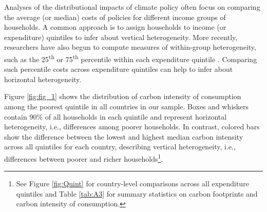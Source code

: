 \documentclass[12pt, a4paper]{article}
\begin{document}
Analyses of the distributional impacts of climate policy often focus on comparing the average (or median) costs of policies for different income groups of households. A common approach is to assign households to income (or expenditure) quintiles to infer about vertical heterogeneity. More recently, researchers have also begun to compute measures of within-group heterogeneity, such as the 25\textsuperscript{th} or 75\textsuperscript{th} percentile within each expenditure quintile \autocite{Cronin.2019, Missbach.2024}. Comparing such percentile costs across expenditure quintiles can help to infer about horizontal heterogeneity.

Figure \ref{fig:fig_1} shows the distribution of carbon intensity of consumption among the poorest quintile in all countries in our sample. Boxes and whiskers contain 90\% of all households in each quintile and represent horizontal heterogeneity, i.e., differences among poorer households. In contrast, colored bars show the difference between the lowest and highest median carbon intensity across all quintiles for each country, describing vertical heterogeneity, i.e., differences between poorer and richer households\footnote{See Figure \ref{fig:Quint} for country-level comparisons across all expenditure quintiles and Table \ref{tab:A3} for summary statistics on carbon footprints and carbon intensity of consumption.}.
\end{document}
